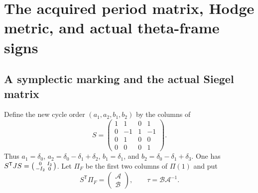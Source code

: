 \documentclass[11pt]{article}
\theoremstyle{definition}
\theoremstyle{remark}
\begin{document}
\section{The acquired period matrix, Hodge metric, and actual theta-frame signs}
\label{sec:v8-acquisition}

\subsection{A symplectic marking and the actual Siegel matrix}
Define the new cycle order $(a_1,a_2,b_1,b_2)$ by the columns of
\begin{equation}
 S=\begin{pmatrix}1&1&0&1\\0&-1&1&-1\\0&1&0&0\\0&0&0&1\end{pmatrix}.
 \label{eq:v8-S}
\end{equation}
Thus $a_1=\delta_0$, $a_2=\delta_0-\delta_1+\delta_2$,
$b_1=\delta_1$, and $b_2=\delta_0-\delta_1+\delta_3$. One has
$S^{\mathsf T}JS=\begin{psmallmatrix}0&I_2\\-I_2&0\end{psmallmatrix}$.
Let $\Pi_F$ be the first two columns of $\Pi(1)$ and put
\begin{equation}
 S^{\mathsf T}\Pi_F=\begin{pmatrix}\mathcal A\\\mathcal B\end{pmatrix},
 \qquad \tau=\mathcal B\mathcal A^{-1}.
 \label{eq:v8-tau}
\end{equation}
\end{document}
